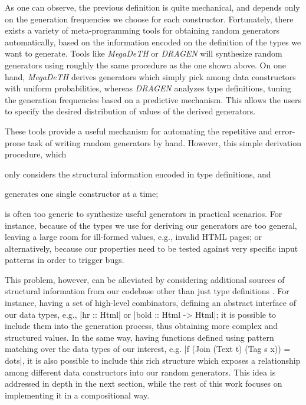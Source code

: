 %
As one can observe, the previous definition is quite mechanical, and depends
only on the generation frequencies we choose for each constructor.
%
Fortunately, there exists a variety of meta-programming tools for obtaining
random generators automatically, based on the information encoded on the
definition of the types we want to generate.
%
Tools like \emph{MegaDeTH} or \emph{DRAGEN} will synthesize random generators
using roughly the same procedure as the one shown above.
%
On one hand, \emph{MegaDeTH} derives generators which simply pick among data
constructors with uniform probabilities, whereas \emph{DRAGEN} analyzes type
definitions, tuning the generation frequencies based on a predictive mechanism.
%
This allows the users to specify the desired distribution of values of the
derived generators.


%
These tools provide a useful mechanism for automating the repetitive and
error-prone task of writing random generators by hand.
%
However, this simple derivation procedure, which
%
\begin{inparaenum}[(i)]
\item only considers the structural information encoded in type definitions, and
\item generates one single constructor at a time;
\end{inparaenum}
%
is often too generic to synthesize useful generators in practical scenarios.
%
For instance, because of the types we use for deriving our generators are too
general, leaving a large room for ill-formed values, e.g., invalid HTML pages;
or alternatively, because our properties need to be tested against very specific
input patterns in order to trigger bugs.


This problem, however, can be alleviated by considering additional sources of
structural information from our codebase other than just type definitions
\cite{Mista2019GeneratingRS}.
%
For instance, having a set of high-level combinators, defining an abstract
interface of our data types, e.g., |hr :: Html| or |bold :: Html -> Html|; it is
possible to include them into the generation process, thus obtaining more
complex and structured values.
%
In the same way, having functions defined using pattern matching over the data
types of our interest, e.g. |f (Join (Text t) (Tag s x)) = dots|, it is also
possible to include this rich structure which exposes a relationship among
different data constructors into our random generators.
%
This idea is addressed in depth in the next section, while the rest of this work
focuses on implementing it in a compositional way.

